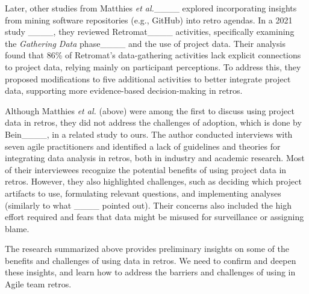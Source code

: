 Later, other studies from Matthies \textit{et al.}____ explored incorporating insights from mining software repositories (e.g., GitHub) into retro agendas. 
In a 2021 study ____, they reviewed Retromat____ activities, specifically examining the \textit{Gathering Data} phase____ and the use of project data. Their analysis found that 86\% of Retromat's data-gathering activities lack explicit connections to project data, relying mainly on participant perceptions. 
To address this, they proposed modifications to five additional activities to better integrate project data, supporting more evidence-based decision-making in retros.

Although Matthies \textit{et al.} (above) were among the first to discuss using project data in retros, they did not address the challenges of adoption, which is done by Bein____, in a related study to ours. The author conducted interviews with seven agile practitioners and identified a lack of guidelines and theories for integrating data analysis in retros, both in industry and academic research.
Most of their interviewees recognize the potential benefits of using project data in retros. However, they also highlighted challenges, such as deciding which project artifacts to use, formulating relevant questions, and implementing analyses (similarly to what ____ pointed out). Their concerns also included the high effort required and fears that data might be misused for surveillance or assigning blame.

The research summarized above provides preliminary insights on some of the benefits and challenges of using data in retros. We need to confirm and deepen these insights, and learn how to address the barriers and challenges of using  in Agile team retros. 


